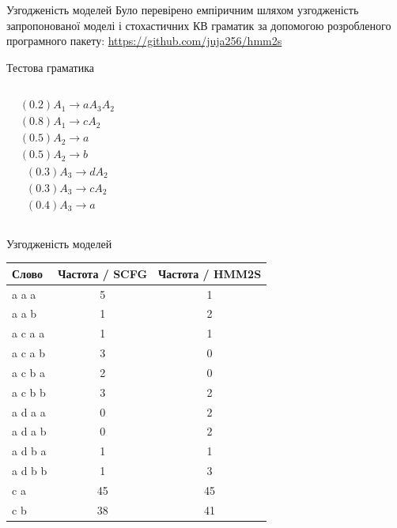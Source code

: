 \documentclass{beamer}
\begin{document}
\begin{darkframes}
    \begin{frame}{Узгодженість моделей}
      Було перевірено емпіричним шляхом узгодженість запропонованої моделі і стохастичних КВ граматик за допомогою розробленого програмного пакету: \url{https://github.com/juja256/hmm2s}
      \begin{alertblock}{Тестова граматика}
        \begin{columns}[onlytextwidth]
          \begin{align*}
            & (0.2) A_1 \rightarrow a A_3 A_2 \\
            & (0.8) A_1 \rightarrow c A_2 \\
            & (0.5) A_2 \rightarrow a \\
            & (0.5) A_2 \rightarrow b
          \end{align*}
          \begin{align*}
            & (0.3) A_3 \rightarrow d A_2 \\
            & (0.3) A_3 \rightarrow c A_2 \\
            & (0.4) A_3 \rightarrow a
          \end{align*}
        \end{columns}

      \end{alertblock}
    \end{frame}


    \begin{frame}{Узгодженість моделей}
      \begin{table}[!b]
        {\carlitoTLF %
        \begin{tabularx}{\textwidth}{Xcc}
          \textbf{Слово} & \textbf{Частота / SCFG} & \textbf{Частота / HMM2S} \\
          \toprule
          a a a & 5 & 1 \\
          a a b & 1 & 2 \\
          a c a a & 1 & 1 \\
          a c a b & 3 & 0 \\
          a c b a & 2 & 0 \\
          a c b b & 3 & 2 \\
          a d a a & 0 & 2 \\
          a d a b & 0 & 2 \\
          a d b a & 1 & 1 \\
          a d b b & 1 & 3 \\
          c a & 45 & 45 \\
          c b & 38 & 41
        \end{tabularx}}

      \end{table}

    \end{frame}

  \end{darkframes}
\end{document}
